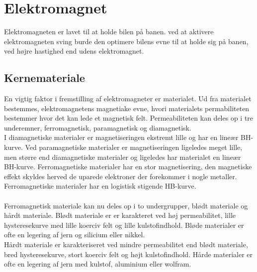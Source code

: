 \section{Elektromagnet}
Elektromagneten er lavet til at holde bilen på banen. ved at aktivere elektromagneten sving burde den optimere bilens evne til at holde sig på banen, ved højre hastighed end udens elektromagnet.

\subsection{Kernemateriale}
En vigtig faktor i fremstilling af elektromagneter er materialet. Ud fra materialet bestemmes, elektromagnetens magnetiake evne, hvori materialets permabiliteten bestemmer hvor det kan lede et magnetisk felt. Permeabiliteten kan deles op i tre underemner, ferromagnetisk, paramagnetisk og diamagnetisk. \\
I diamagnetiske materialer er magnetiseringen ekstremt lille og har en lineær BH-kurve. Ved paramagnetiske materialer er magnetiseringen ligeledes meget lille, men større end diamagnetiske materialer og ligeledes har materialet en lineær BH-kurve. Ferromagnetiske materialer har en stor magnetisering, den magnetiske effekt skyldes herved de uparede elektroner der forekommer i nogle metaller. Ferromagnetiske materialer har en logistisk stigende HB-kurve.\\
  \\
Ferromagnetisk materiale kan nu deles op i to undergrupper, blødt materiale og hårdt materiale. Blødt materiale er er karakteret ved høj permeabilitet, lille hysteresekurve med lille koerciv felt og lille kulstofindhold. Bløde materialer er ofte en legering af jern og silicium eller nikkel.\\
Hårdt materiale er karakteriseret ved mindre permeabilitet end blødt materiale, bred hysteresekurve, stort koerciv felt og højt kulstofindhold. Hårde materialer er ofte en legering af jern med kulstof, aluminium eller wolfram. 

